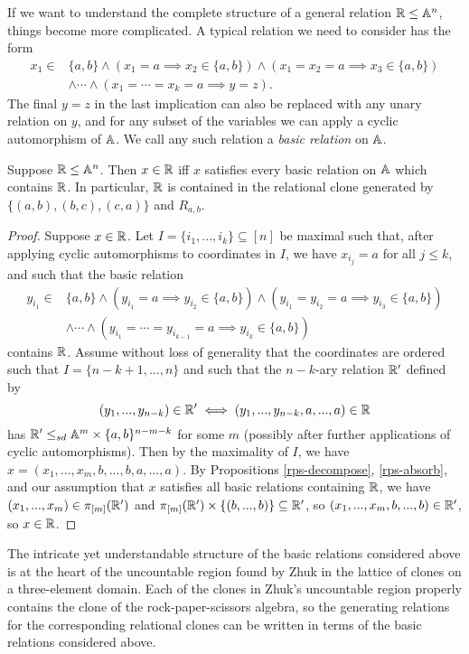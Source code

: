 \documentclass[letterpaper,11pt]{article}
\begin{document}
If we want to understand the complete structure of a general relation $\mathbb{R} \le \mathbb{A}^n$, things become more complicated. A typical relation we need to consider has the form
\begin{align*}
x_1 \in &\{a,b\} \wedge (x_1 = a \implies x_2 \in \{a,b\}) \wedge (x_1 = x_2 = a \implies x_3 \in \{a,b\})\\
&\wedge \cdots \wedge (x_1 = \cdots = x_k = a \implies y=z).
\end{align*}
The final $y=z$ in the last implication can also be replaced with any unary relation on $y$, and for any subset of the variables we can apply a cyclic automorphism of $\mathbb{A}$. We call any such relation a \emph{basic relation} on $\mathbb{A}$.

\begin{thm} Suppose $\mathbb{R} \le \mathbb{A}^n$. Then $x \in \mathbb{R}$ iff $x$ satisfies every basic relation on $\mathbb{A}$ which contains $\mathbb{R}$. In particular, $\mathbb{R}$ is contained in the relational clone generated by $\{(a,b), (b,c), (c,a)\}$ and $R_{a,b}$.
\end{thm}
\begin{proof} Suppose $x \in \mathbb{R}$. Let $I = \{i_1, ..., i_k\} \subseteq [n]$ be maximal such that, after applying cyclic automorphisms to coordinates in $I$, we have $x_{i_j} = a$ for all $j \le k$, and such that the basic relation
\begin{align*}
y_{i_1} \in &\{a,b\} \wedge (y_{i_1} = a \implies y_{i_2} \in \{a,b\}) \wedge (y_{i_1} = y_{i_2} = a \implies y_{i_3} \in \{a,b\})\\
&\wedge \cdots \wedge (y_{i_1} = \cdots = y_{i_{k-1}} = a \implies y_{i_k} \in \{a,b\})
\end{align*}
contains $\mathbb{R}$. Assume without loss of generality that the coordinates are ordered such that $I = \{n-k+1, ..., n\}$ and such that the $n-k$-ary relation $\mathbb{R}'$ defined by
\[
(y_1, ..., y_{n-k}) \in \mathbb{R}' \iff (y_1, ..., y_{n-k}, a, ..., a) \in \mathbb{R}
\]
has $\mathbb{R}' \le_{sd} \mathbb{A}^m\times \{a,b\}^{n-m-k}$ for some $m$ (possibly after further applications of cyclic automorphisms). Then by the maximality of $I$, we have $x = (x_1, ..., x_m, b, ..., b, a, ..., a)$. By Propositions \ref{rps-decompose}, \ref{rps-absorb}, and our assumption that $x$ satisfies all basic relations containing $\mathbb{R}$, we have $(x_1, ..., x_m) \in \pi_{[m]}(\mathbb{R}')$ and $\pi_{[m]}(\mathbb{R}')\times \{(b,...,b)\} \subseteq \mathbb{R}'$, so $(x_1, ..., x_m, b, ..., b) \in \mathbb{R}'$, so $x \in \mathbb{R}$.
\end{proof}

\begin{rem} The intricate yet understandable structure of the basic relations considered above is at the heart of the uncountable region found by Zhuk \cite{zhuk-selfdual} in the lattice of clones on a three-element domain. Each of the clones in Zhuk's uncountable region properly contains the clone of the rock-paper-scissors algebra, so the generating relations for the corresponding relational clones can be written in terms of the basic relations considered above.
\end{rem}
\end{document}
